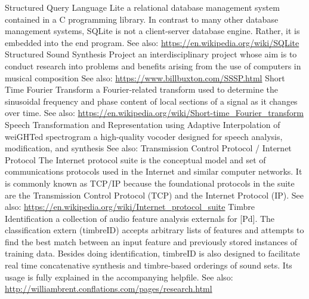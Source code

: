 	{Structured Query Language Lite}
	{a relational database management system contained in a C programming library. In contrast to many other database management systems, SQLite is not a client-server database engine. Rather, it is embedded into the end program.  See also: \url{https://en.wikipedia.org/wiki/SQLite}}
	{Structured Sound Synthesis Project}
	{an interdisciplinary project whose aim is to conduct research into problems and benefits arising from the use of computers in musical composition See also: \url{https://www.billbuxton.com/SSSP.html}}
	{Short Time Fourier Transform}
	{ a Fourier-related transform used to determine the sinusoidal frequency and phase content of local sections of a signal as it changes over time. See also: \url{https://en.wikipedia.org/wiki/Short-time_Fourier_transform}}
	{Speech Transformation and Representation using Adaptive Interpolation of weiGHTed spectrogram}
	{a high-quality vocoder designed for speech analysis, modification, and synthesis See also: \url{} \cite{icmc/bbp2372.1999.411}}
	{Transmission Control Protocol / Internet Protocol}
	{The Internet protocol suite is the conceptual model and set of communications protocols used in the Internet and similar computer networks. It is commonly known as TCP/IP because the foundational protocols in the suite are the Transmission Control Protocol (TCP) and the Internet Protocol (IP). See also: \url{https://en.wikipedia.org/wiki/Internet_protocol_suite}}
	{Timbre Identification}
	{a collection of audio feature analysis externals for [Pd]. The classification extern (timbreID) accepts arbitrary lists of features and attempts to find the best match between an input feature and previously stored instances of training data. Besides doing identification, timbreID is also designed to facilitate real time concatenative synthesis and timbre-based orderings of sound sets. Its usage is fully explained in the accompanying helpfile. See also: \url{http://williambrent.conflations.com/pages/research.html} \cite{icmc/bbp2372.2010.044}}

